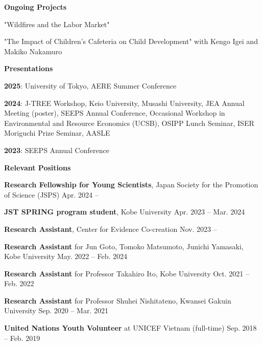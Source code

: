 \documentclass{article}
\begin{document}
\begin{flushleft}
  \textbf{\large{Ongoing Projects}}
\end{flushleft}

"Wildfires and the Labor Market"

"The Impact of Children's Cafeteria on Child Development" with Kengo Igei and Makiko Nakamuro

\hrulefill

\begin{flushleft}
  \textbf{\large{Presentations}}
\end{flushleft}

\textbf{2025}: University of Tokyo, AERE Summer Conference

\textbf{2024}: J-TREE Workshop, Keio University, Musashi University, JEA Annual Meeting (poster), SEEPS Annual Conference, Occasional Workshop in Environmental and Resource Economics (UCSB), OSIPP Lunch Seminar, ISER Moriguchi Prize Seminar, AASLE

\textbf{2023}: SEEPS Annual Conference

\hrulefill

\begin{flushleft}
  \textbf{\large{Relevant Positions}}
\end{flushleft}

\textbf{Research Fellowship for Young Scientists}, Japan Society for the Promotion of Science (JSPS) \hspace{\fill} Apr. 2024 --

\textbf{JST SPRING program student}, Kobe University \hspace{\fill} Apr. 2023 -- Mar. 2024

\textbf{Research Assistant}, Center for Evidence Co-creation \hspace{\fill} Nov. 2023 --

\textbf{Research Assistant} for Jun Goto, Tomoko Matsumoto, Junichi Yamasaki, Kobe University \hspace{\fill} May. 2022 -- Feb. 2024

\textbf{Research Assistant} for Professor Takahiro Ito, Kobe University \hspace{\fill} Oct. 2021 -- Feb. 2022

\textbf{Research Assistant} for Professor Shuhei Nishitateno, Kwansei Gakuin University \hspace{\fill} Sep. 2020 -- Mar. 2021

\textbf{United Nations Youth Volunteer} at UNICEF Vietnam (full-time) \hspace{\fill} Sep. 2018 -- Feb. 2019
\end{document}
